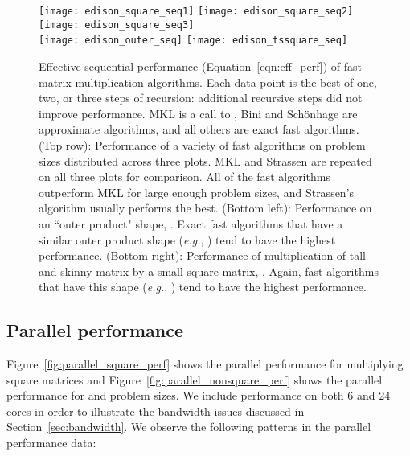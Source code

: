 \documentclass[preprint]{sigplanconf}
\begin{document}
\begin{figure*}[tb]
\centering
\texttt{[image: edison\_square\_seq1]}
\texttt{[image: edison\_square\_seq2]}
\texttt{[image: edison\_square\_seq3]} \\
\texttt{[image: edison\_outer\_seq]}
\texttt{[image: edison\_tssquare\_seq]}
\caption{
Effective sequential performance (Equation~\eqref{eqn:eff_perf}) of fast matrix multiplication algorithms.
Each data point is the best of one, two, or three steps of recursion: additional recursive steps did not improve performance.
MKL is a call to ,
Bini and Sch\"{o}nhage are approximate algorithms, 
and all others are exact fast algorithms.
(Top row):
Performance of a variety of fast algorithms on  problem sizes distributed across three plots.
MKL and Strassen are repeated on all three plots for comparison.
All of the fast algorithms outperform MKL for large enough problem sizes, and Strassen's algorithm usually performs the best.
(Bottom left):
Performance on an ``outer product" shape, .
Exact fast algorithms that have a similar outer product shape (\emph{e.g.}, ) tend to have the highest performance.
(Bottom right):
Performance of multiplication of tall-and-skinny matrix by a small square matrix, .
Again, fast algorithms that have this shape (\emph{e.g.}, ) tend to have the highest performance.
}
\label{fig:sequential_perf}
\end{figure*}


\subsection{Parallel performance}
\label{sec:perf_parallel}

Figure~\ref{fig:parallel_square_perf} shows the parallel performance for multiplying square matrices and Figure~\ref{fig:parallel_nonsquare_perf} shows the parallel performance for  and  problem sizes.
We include performance on both 6 and 24 cores in order to illustrate the bandwidth issues discussed in Section~\ref{sec:bandwidth}.
We observe the following patterns in the parallel performance data:
\end{document}
